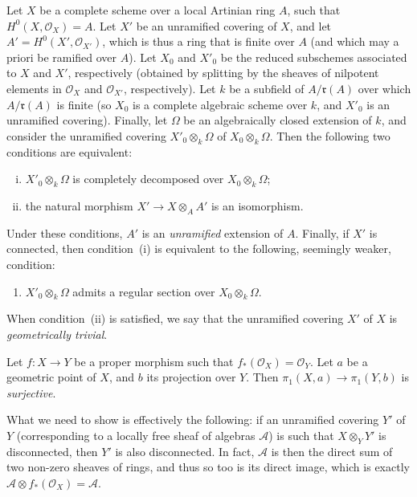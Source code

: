\documentclass{article}
\theoremstyle{plain}
\newenvironment{lemma}[1]
  {\renewcommand\theinnercustomlemma{#1}\innercustomlemma}
  {\endinnercustomlemma}
\theoremstyle{definition}
\newcommand{\sh}{\mathscr}
\newcommand{\fk}{\mathfrak}
\newcommand{\oldpage}[1]{\marginpar{\footnotesize$\Big\vert$ \textit{p.~#1}}}
\begin{document}
\begin{lemma}{3}
\label{lemma3}
  Let $X$ be a complete scheme over a local Artinian ring $A$, such that $H^0(X,\sh{O}_X)=A$.
  Let $X'$ be an unramified covering of $X$, and let $A'=H^0(X',\sh{O}_{X'})$, which is thus a ring that is finite over $A$ (and which may a priori be ramified over $A$).
  Let $X_0$ and $X'_0$ be the reduced subschemes associated to $X$ and $X'$, respectively (obtained by splitting by the sheaves of nilpotent elements in $\sh{O}_X$ and $\sh{O}_{X'}$, respectively).
  Let $k$ be a subfield of $A/\fk{r}(A)$ over which $A/\fk{r}(A)$ is finite (so $X_0$ is a complete algebraic scheme over $k$, and $X'_0$ is an unramified covering).
  Finally, let $\Omega$ be an algebraically closed extension of $k$, and consider the unramified covering $X'_0\otimes_k\Omega$ of $X_0\otimes_k\Omega$.
  Then the following two conditions are equivalent:
\oldpage{182-20}
  \begin{enumerate}[i.]
    \item $X'_0\otimes_k\Omega$ is completely decomposed over $X_0\otimes_k\Omega$;
    \item the natural morphism $X'\to X\otimes_AA'$ is an isomorphism.
  \end{enumerate}

  Under these conditions, $A'$ is an \emph{unramified} extension of $A$.
  Finally, if $X'$ is connected, then condition~(i) is equivalent to the following, seemingly weaker, condition:
  \begin{enumerate}[i bis.]
    \item $X'_0\otimes_k\Omega$ admits a regular section over $X_0\otimes_k\Omega$.
  \end{enumerate}
\end{lemma}

When condition~(ii) is satisfied, we say that the unramified covering $X'$ of $X$ is \emph{geometrically trivial}.

\begin{lemma}{4}
\label{lemma4}
  Let $f\colon X\to Y$ be a proper morphism such that $f_*(\sh{O}_X)=\sh{O}_Y$.
  Let $a$ be a geometric point of $X$, and $b$ its projection over $Y$.
  Then $\pi_1(X,a)\to\pi_1(Y,b)$ is \emph{surjective}.
\end{lemma}

What we need to show is effectively the following: if an unramified covering $Y'$ of $Y$ (corresponding to a locally free sheaf of algebras $\sh{A}$) is such that $X\otimes_YY'$ is disconnected, then $Y'$ is also disconnected.
In fact, $\sh{A}$ is then the direct sum of two non-zero sheaves of rings, and thus so too is its direct image, which is exactly $\sh{A}\otimes f_*(\sh{O}_X)=\sh{A}$.
\end{document}
